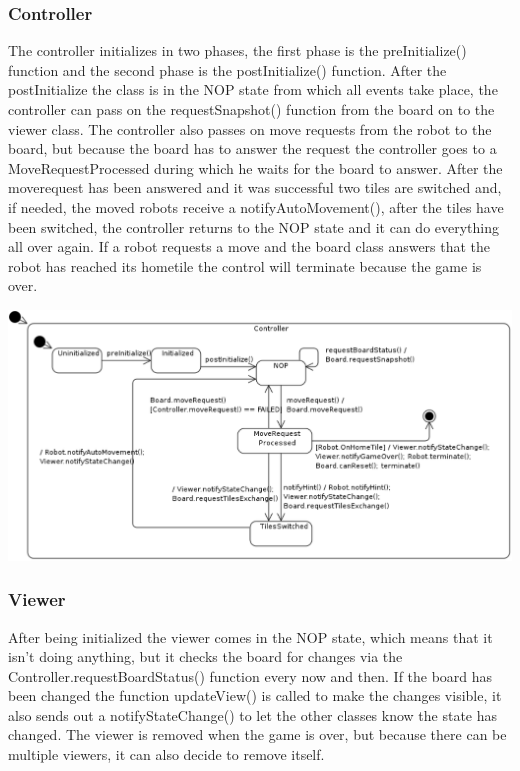 	\subsubsection{Controller}
	The controller initializes in two phases, the first phase is the preInitialize() function and the second phase is the postInitialize() function. After the postInitialize the class is in the NOP state from which all events take place, the controller can pass on the requestSnapshot() function from the board on to the viewer class. The controller also passes on move requests from the robot to the board, but because the  board has to answer the request the controller goes to a MoveRequestProcessed during which he waits for the board to answer. After the moverequest has been answered and it was successful two tiles are switched and, if needed, the moved robots receive a notifyAutoMovement(), after the tiles have been switched, the controller returns to the NOP state and it can do everything all over again. If a robot requests a move and the board class answers that the robot has reached its hometile the control will terminate because the game is over.

	\includegraphics[width=\linewidth]{statecharts/controller.pdf}

	\subsubsection{Viewer}
	After being initialized the viewer comes in the NOP state, which means that it isn't doing anything, but it checks the board for changes via the Controller.requestBoardStatus() function every now and then. If the board has been changed the function updateView() is called to make the changes visible, it also sends out a notifyStateChange() to let the other classes know the state has changed. The viewer is removed when the game is over, but because there can be multiple viewers, it can also decide to remove itself.
	
